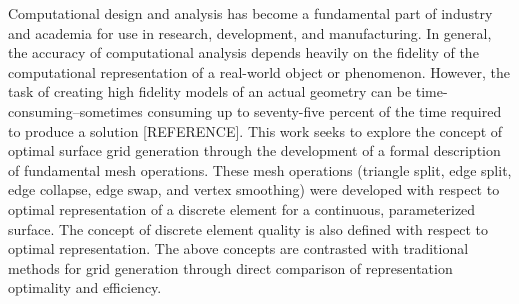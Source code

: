 Computational design and analysis has become a fundamental part of industry and academia for use in research, development, and manufacturing. In general, the accuracy of computational analysis depends heavily on the fidelity of the computational representation of a real-world object or phenomenon. However, the task of creating high fidelity models of an actual geometry can be time-consuming--sometimes consuming up to seventy-five percent of the time required to produce a solution [REFERENCE]. This work seeks to explore the concept of optimal surface grid generation through the development of a formal description of fundamental mesh operations. These mesh operations (triangle split, edge split, edge collapse, edge swap, and vertex smoothing) were developed with respect to optimal representation of a discrete element for a continuous, parameterized surface. The concept of discrete element quality is also defined with respect to optimal representation. The above concepts are contrasted with traditional methods for grid generation through direct comparison of representation optimality and efficiency.
